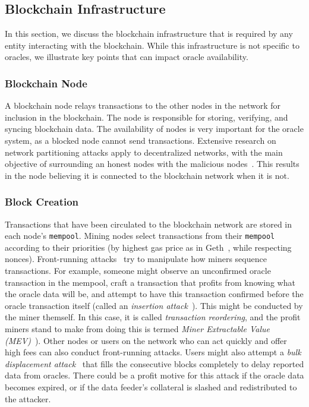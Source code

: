 \subsection{Blockchain Infrastructure}  \label{blockchainInfrastructure}

In this section, we discuss the blockchain infrastructure that is required by any entity interacting with the blockchain. While this infrastructure is not specific to oracles, we illustrate key points that can impact oracle availability. 

\subsubsection{Blockchain Node} %

A blockchain node relays transactions to the other nodes in the network for inclusion in the blockchain. The node is responsible for storing, verifying, and syncing blockchain data. The availability of nodes is very important for the oracle system, as a blocked node cannot send transactions. Extensive research on network partitioning attacks apply to decentralized networks, with the main objective of surrounding an honest nodes with the malicious nodes~\cite{vasek2014empirical,neudecker2015simulation,zhang2019double,heilman2015eclipse,henningsen2019eclipsing}. This results in the node believing it is connected to the blockchain network when it is not.
 

\subsubsection{Block Creation}\label{block_creation}
Transactions that have been circulated to the blockchain network are stored in each node's \texttt{mempool}. Mining nodes select transactions from their \texttt{mempool} according to their priorities (\eg by highest gas price as in Geth~\cite{geth}, while respecting nonces). Front-running attacks~\cite{eskandari2019sok,daian2020flash} try to manipulate how miners sequence transactions. For example, someone might observe an unconfirmed oracle transaction in the mempool, craft a transaction that profits from knowing what the oracle data will be, and attempt to have this transaction confirmed before the oracle transaction itself (called an \textit{insertion attack}~\cite{eskandari2019sok}). This might be conducted by the miner themself. In this case, it is called \textit{transaction reordering}, and the profit miners stand to make from doing this is termed \textit{Miner Extractable Value (MEV)}~\cite{daian2020flash}). Other nodes or users on the network who can act quickly and offer high fees can also conduct front-running attacks. Users might also attempt a \textit{bulk displacement attack}~\cite{eskandari2019sok} that fills the consecutive blocks completely to delay reported data from oracles. There could be a profit motive for this attack if the oracle data becomes expired, or if the data feeder's collateral is slashed and redistributed to the attacker. 

